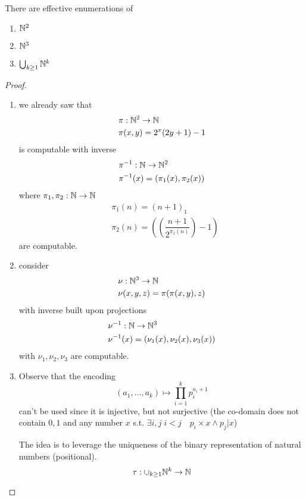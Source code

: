 \begin{lemma}
  There are effective enumerations of
  \begin{enumerate}[label=(\arabic*)]
  \item $ \mathbb{N}^2 $
  \item $ \mathbb{N}^3 $
  \item $\bigcup_{k\geq 1} \mathbb{N}^k $
  \end{enumerate}
  \begin{proof}
    \begin{enumerate}[label=(\arabic*)]
    \item we already saw that 
      \begin{align*}
        &\pi : \mathbb{N}^2 \to
        \mathbb{N} \\
        &\pi(x,y) = 2^x(2y+1)-1
      \end{align*}  
     is computable
       with inverse
       \begin{align*}
        &\pi^{-1} : \mathbb{N} \to \mathbb{N}^2\\
        &\pi^{-1}(x) = (\pi_1(x), \pi_2(x))
       \end{align*}
      where $\pi_1,\pi_2 : \mathbb{N} \to \mathbb{N}$
      \begin{align*}
        &\pi_1 (n) = (n+1)_1\\
        &\pi_2(n) = \left(\left(\dfrac{n+1}{2^{\pi_1(n)}}\right)-1\right)
       \end{align*}
       are computable.
    \item{
        consider 
        \begin{align*}
          &\nu : \mathbb{N}^3 \to
          \mathbb{N}\\
          &\nu(x,y,z)= \pi(\pi(x,y),z)
        \end{align*}
        with inverse built upon projections
        \begin{align*}
          &\nu^{-1} : \mathbb{N} \to \mathbb{N}^3\\
          &\nu^{-1}(x) = (\nu_1(x), \nu_2(x), \nu_3(x))
        \end{align*}
        with $\nu_1, \nu_2, \nu_3$ are computable.}
    \item{ Observe that the encoding
        \[(a_1, \dots, a_k) \mapsto \prod^k_{i=1}p_i^{a_i+1}\] can't
        be used since it is injective, but not surjective (the
        co-domain does not contain $0,1$ and any number $x$
        s.t. \(\exists i,j \; i<j \quad p_i \times x \wedge p_j | x\))

        The idea is to leverage the uniqueness of the binary
        representation of natural numbers (positional).
        \[\tau : \cup_{k \geq 1} \mathbb{N}^k \to \mathbb{N} \]

}
\end{enumerate}
\end{proof}
\end{lemma}
